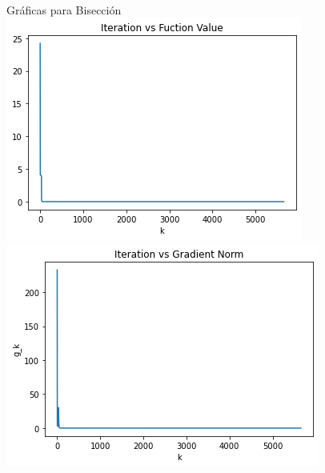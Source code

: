 \documentclass[11pt,letterpaper]{article}
\theoremstyle{definition}
\theoremstyle{definition}
\theoremstyle{definition}
\begin{document}
\begin{center}
	\\
	Gráficas para Bisección
	\\
	\includegraphics[width=0.8\linewidth]{graficas/rosembrock_bisection_2f}
	\\
	\includegraphics[width=0.8\linewidth]{graficas/rosembrock_bisection_2g}
\end{center}
\end{document}
